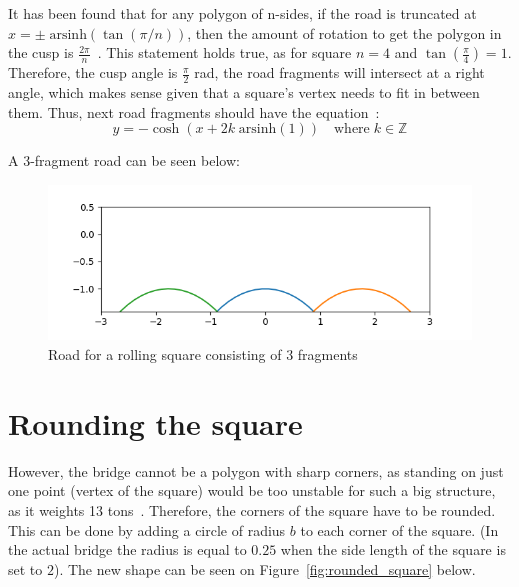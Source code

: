 \documentclass[12pt]{article}
\begin{document}
        It has been found that for any polygon of n-sides, if the road is truncated at $x = \pm \; \text{arsinh}(\tan(\pi / n))$, then the amount of rotation to get the polygon in the cusp is $\frac{2\pi}{n}$~\cite{Hall_Wagon_1992}. This statement holds true, as for square $n=4$ and $\tan(\frac{\pi}{4}) = 1$. Therefore, the cusp angle is $\frac{\pi}{2}$ rad, the road fragments will intersect at a right angle, which makes sense given that a square's vertex needs to fit in between them. Thus, next road fragments should have the equation~\cite{Hall_Wagon_1992}:
        \begin{equation}
            y = - \cosh (x + 2k \;\text{arsinh}(1) ) \quad \text{where}\; k \in \mathbb{Z}
        \end{equation}
        
        A 3-fragment road can be seen below:
        \begin{figure}[H]
            \centering
            \includegraphics[width=\linewidth]{images/road_3.png}
            \caption{Road for a rolling square consisting of 3 fragments}\label{fig:road3}
        \end{figure}

    \section{Rounding the square}

        However, the bridge cannot be a polygon with sharp corners, as standing on just one point (vertex of the square) would be too unstable for such a big structure, as it weights 13 tons~\cite{bridge_newatlas}. Therefore, the corners of the square have to be rounded. This can be done by adding a circle of radius $b$ to each corner of the square. (In the actual bridge the radius is equal to $0.25$ when the side length of the square is set to $2$). The new shape can be seen on Figure~\ref{fig:rounded_square} below.
\end{document}
